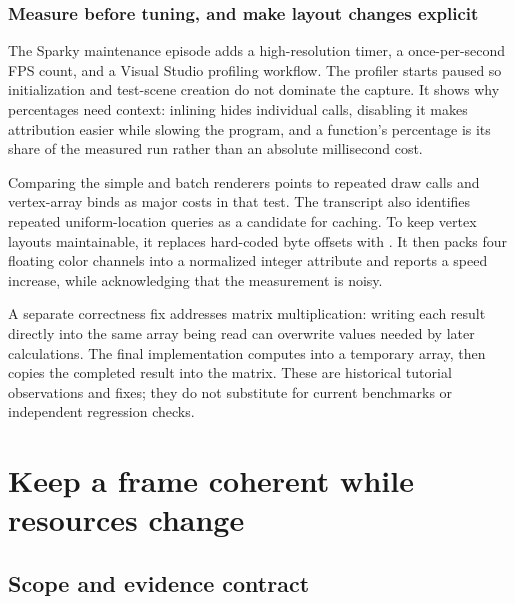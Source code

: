 \subsubsection{Measure before tuning, and make layout changes explicit}\label{06-engine-ii-ch041-measure-before-tuning-and-make-layout-changes-explicit}

\hypertarget{06-engine-ii-ch041-measure-before-tuning-and-make-layout-changes-explicit}{}

The Sparky maintenance episode adds a high-resolution timer, a once-per-second FPS count, and a Visual Studio profiling workflow. The profiler starts paused so initialization and test-scene creation do not dominate the capture. It shows why percentages need context: inlining hides individual calls, disabling it makes attribution easier while slowing the program, and a function's percentage is its share of the measured run rather than an absolute millisecond cost.

Comparing the simple and batch renderers points to repeated draw calls and vertex-array binds as major costs in that test. The transcript also identifies repeated uniform-location queries as a candidate for caching. To keep vertex layouts maintainable, it replaces hard-coded byte offsets with . It then packs four floating color channels into a normalized integer attribute and reports a speed increase, while acknowledging that the measurement is noisy.

A separate correctness fix addresses matrix multiplication: writing each result directly into the same array being read can overwrite values needed by later calculations. The final implementation computes into a temporary array, then copies the completed result into the matrix. These are historical tutorial observations and fixes; they do not substitute for current benchmarks or independent regression checks.

\section{Keep a frame coherent while resources change}\label{06-engine-ii-ch041-keep-a-frame-coherent-while-resources-change}

\hypertarget{06-engine-ii-ch041-keep-a-frame-coherent-while-resources-change}{}

\subsection{Scope and evidence contract}\label{06-engine-ii-ch041-scope-and-evidence-contract}

